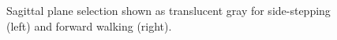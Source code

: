 \begin{figure}[!h]
	\begin{center}
	\end{center}
  	\caption{Sagittal plane selection shown as translucent gray for side-stepping (left) and forward walking (right).}
	\label{fig:sagittal_plane}
\end{figure}

